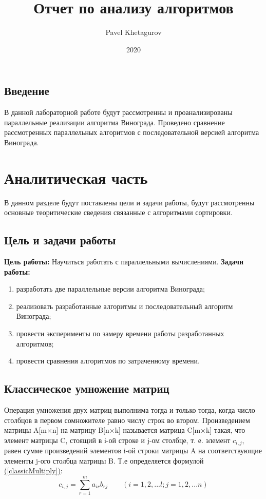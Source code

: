 \documentclass{article}
\title{Отчет по анализу алгоритмов}
\date{2020}
\author{Pavel Khetagurov}
\begin{document}
	
	\newpage
	\tableofcontents
	\newpage
	\begin{center}
	    \section*{Введение}
	\end{center}
		\indent \indent В данной лабораторной работе будут рассмотренны и проанализированы параллельные реализации алгоритма Винограда. Проведено сравнение рассмотренных параллельных алгоритмов с последовательной версией алгоритма Винограда.
	\newpage
	\section{Аналитическая часть}
	В данном разделе будут поставлены цели и задачи работы, будут рассмотренны основные теоритические сведения связанные с алгоритмами сортировки.
		\subsection{Цель и задачи работы}
			\textbf{Цель работы:}
			\newline
			Научиться работать с параллельными вычислениями.
			\newline 
			\indent \textbf{Задачи работы:}
			\begin{enumerate}
				\item разработать две параллельные версии алгоритма Винограда;
				\item реализовать разработанные алгоритмы и последовательный алгоритм Винограда;
				\item провести эксперименты по замеру времени работы разработанных алгоритмов;
				\item провести сравнения алгоритмов по затраченному времени.
			\end{enumerate}

		\subsection{Классическое умножение матриц}
		Операция умножения двух матриц выполнима тогда и только тогда, когда число
столбцов в первом сомножителе равно числу строк во втором.
\newline
\indent				Произведением матрицы A[m×n] на матрицу B[n×k] называется матрица C[m×k] такая,
			что элемент матрицы C, стоящий в i-ой строке и j-ом столбце, т. е. элемент $c_{i,j}$, равен сумме
			произведений элементов i-ой строки матрицы A на соответствующие элементы j-ого столбца
матрицы B. Т.е определяется формулой \hyperref[classicMultiply]{(\ref{classicMultiply})}:
			\begin{equation}\label{classicMultiply}
			c_{i,j} = \sum_{r=1}^{m}a_{ir}b_{rj} \qquad (i=1,2,...l; j = 1,2,...n)
			 \end{equation}
\end{document}
